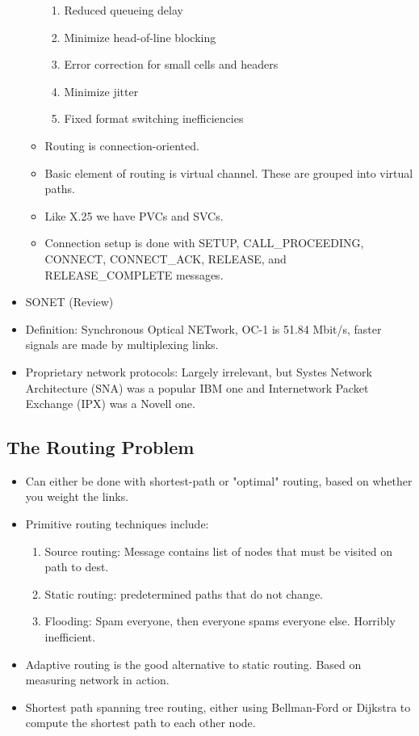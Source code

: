 \documentclass{scrartcl}
\begin{document}
\begin{itemize}
\begin{itemize}
\begin{enumerate}
\item Reduced queueing delay
\item Minimize head-of-line blocking
\item Error correction for small cells and headers
\item Minimize jitter
\item Fixed format switching inefficiencies
\end{enumerate}
\item Routing is connection-oriented.
\item Basic element of routing is virtual channel. These are grouped into virtual paths.
\item Like X.25 we have PVCs and SVCs.
\item Connection setup is done with SETUP, CALL\_PROCEEDING, CONNECT, CONNECT\_ACK, RELEASE, and RELEASE\_COMPLETE messages.
\end{itemize}
\item SONET (Review)
\item Definition: Synchronous Optical NETwork, OC-1 is 51.84 Mbit/s, faster signals are made by multiplexing links.
\item Proprietary network protocols: Largely irrelevant, but Systes Network Architecture (SNA) was a popular IBM one and Internetwork Packet Exchange (IPX) was a Novell one.
\end{itemize}
\subsection*{The Routing Problem}
\begin{itemize}
\item Can either be done with shortest-path or "optimal" routing, based on whether you weight the links.
\item Primitive routing techniques include:
\begin{enumerate}
\item Source routing: Message contains list of nodes that must be visited on path to dest.
\item Static routing: predetermined paths that do not change.
\item Flooding: Spam everyone, then everyone spams everyone else. Horribly inefficient.
\end{enumerate}
\item Adaptive routing is the good alternative to static routing. Based on measuring network in action.
\item Shortest path spanning tree routing, either using Bellman-Ford or Dijkstra to compute the shortest path to each other node.
\end{itemize}
\end{document}
